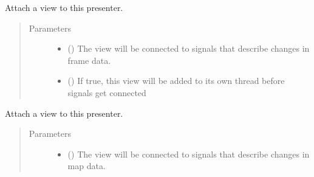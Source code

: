 \documentclass[letterpaper,10pt,english]{sphinxmanual}
\begin{document}
\begin{fulllineitems}
\begin{fulllineitems}
\label{\detokenize{xanespy:xanespy.qt_frameset_presenter.QtFramesetPresenter.active_timestep}}
\end{fulllineitems}


\begin{fulllineitems}
\label{\detokenize{xanespy:xanespy.qt_frameset_presenter.QtFramesetPresenter.add_frame_view}}
Attach a view to this presenter.
\begin{quote}\begin{description}
\item[{Parameters}] \leavevmode\begin{itemize}
\item {} 
 () \textendash{} The view will be connected to signals that describe changes in
frame data.

\item {} 
 (\sphinxstyleliteralemphasis{, }) \textendash{} If true, this view will be added to its own thread before
signals get connected

\end{itemize}

\end{description}\end{quote}

\end{fulllineitems}


\begin{fulllineitems}
\label{\detokenize{xanespy:xanespy.qt_frameset_presenter.QtFramesetPresenter.add_map_view}}
Attach a view to this presenter.
\begin{quote}\begin{description}
\item[{Parameters}] \leavevmode\begin{itemize}
\item {} 
 () \textendash{} The view will be connected to signals that describe changes in
map data.


\end{itemize}
\end{description}
\end{quote}
\end{fulllineitems}
\end{fulllineitems}
\end{document}
